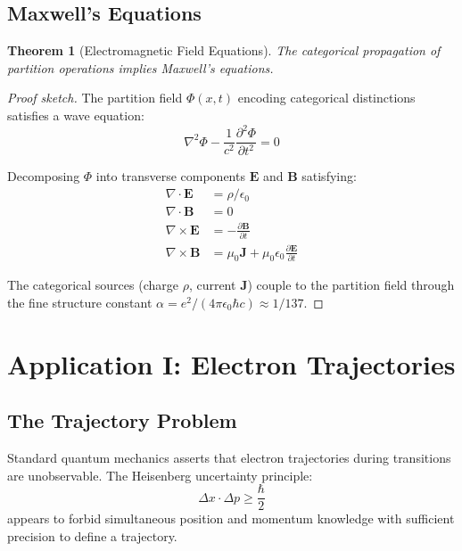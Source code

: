 \documentclass[aps,prl,twocolumn,superscriptaddress,floatfix]{revtex4-2}
\newtheorem{theorem}{Theorem}
\begin{document}
\subsection{Maxwell's Equations}

\begin{theorem}[Electromagnetic Field Equations]
The categorical propagation of partition operations implies Maxwell's equations.
\end{theorem}

\begin{proof}[Proof sketch]
The partition field $\Phi(x,t)$ encoding categorical distinctions satisfies a wave equation:
\begin{equation}
\nabla^2 \Phi - \frac{1}{c^2}\frac{\partial^2 \Phi}{\partial t^2} = 0
\end{equation}

Decomposing $\Phi$ into transverse components $\mathbf{E}$ and $\mathbf{B}$ satisfying:
\begin{align}
\nabla \cdot \mathbf{E} &= \rho/\epsilon_0 \\
\nabla \cdot \mathbf{B} &= 0 \\
\nabla \times \mathbf{E} &= -\frac{\partial \mathbf{B}}{\partial t} \\
\nabla \times \mathbf{B} &= \mu_0 \mathbf{J} + \mu_0\epsilon_0\frac{\partial \mathbf{E}}{\partial t}
\end{align}

The categorical sources (charge $\rho$, current $\mathbf{J}$) couple to the partition field through the fine structure constant $\alpha = e^2/(4\pi\epsilon_0\hbar c) \approx 1/137$.
\end{proof}

\section{Application I: Electron Trajectories}

\subsection{The Trajectory Problem}

Standard quantum mechanics asserts that electron trajectories during transitions are unobservable. The Heisenberg uncertainty principle:
\begin{equation}
\Delta x \cdot \Delta p \geq \frac{\hbar}{2}
\end{equation}
appears to forbid simultaneous position and momentum knowledge with sufficient precision to define a trajectory.
\end{document}
